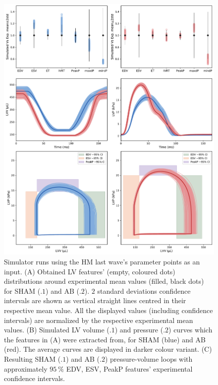 \begin{figure}[!ht]
    \myfloatalign
    \includegraphics[width=\textwidth]{figures/chapter04/sham_vs_ab_fit.pdf}
    \caption{Simulator runs using the HM last wave’s parameter points as an input. (A) Obtained LV features’ (empty, coloured dots) distributions around experimental mean values (filled, black dots) for SHAM (.$1$) and AB (.$2$). $2$ standard deviations confidence intervals are shown as vertical straight lines centred in their respective mean value. All the displayed values (including confidence intervals) are normalized by the respective experimental mean values. (B) Simulated LV volume (.$1$) and pressure (.$2$) curves which the features in (A) were extracted from, for SHAM (blue) and AB (red). The average curves are displayed in darker colour variant. (C) Resulting SHAM (.$1$) and AB (.$2$) pressure-volume loops with approximately $\SI{95}{\percent}$ EDV, ESV, PeakP features’ experimental confidence intervals.}
\end{figure}

